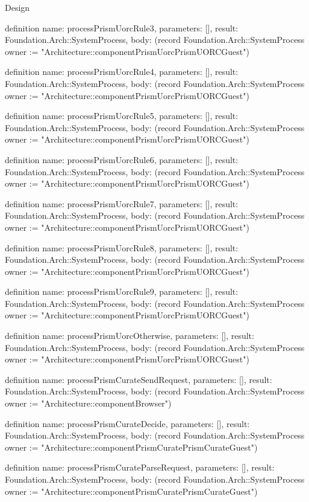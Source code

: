 \begin{lexlean}{Design}
\begin{semanticmodule}
definition{
  name: processPrismUorcRule3,
  parameters: [],
  result: Foundation.Arch::SystemProcess,
  body: (record Foundation.Arch::SystemProcess {owner := "Architecture::componentPrismUorcPrismUORCGuest"})
}

definition{
  name: processPrismUorcRule4,
  parameters: [],
  result: Foundation.Arch::SystemProcess,
  body: (record Foundation.Arch::SystemProcess {owner := "Architecture::componentPrismUorcPrismUORCGuest"})
}

definition{
  name: processPrismUorcRule5,
  parameters: [],
  result: Foundation.Arch::SystemProcess,
  body: (record Foundation.Arch::SystemProcess {owner := "Architecture::componentPrismUorcPrismUORCGuest"})
}

definition{
  name: processPrismUorcRule6,
  parameters: [],
  result: Foundation.Arch::SystemProcess,
  body: (record Foundation.Arch::SystemProcess {owner := "Architecture::componentPrismUorcPrismUORCGuest"})
}

definition{
  name: processPrismUorcRule7,
  parameters: [],
  result: Foundation.Arch::SystemProcess,
  body: (record Foundation.Arch::SystemProcess {owner := "Architecture::componentPrismUorcPrismUORCGuest"})
}

definition{
  name: processPrismUorcRule8,
  parameters: [],
  result: Foundation.Arch::SystemProcess,
  body: (record Foundation.Arch::SystemProcess {owner := "Architecture::componentPrismUorcPrismUORCGuest"})
}

definition{
  name: processPrismUorcRule9,
  parameters: [],
  result: Foundation.Arch::SystemProcess,
  body: (record Foundation.Arch::SystemProcess {owner := "Architecture::componentPrismUorcPrismUORCGuest"})
}

definition{
  name: processPrismUorcOtherwise,
  parameters: [],
  result: Foundation.Arch::SystemProcess,
  body: (record Foundation.Arch::SystemProcess {owner := "Architecture::componentPrismUorcPrismUORCGuest"})
}

definition{
  name: processPrismCurateSendRequest,
  parameters: [],
  result: Foundation.Arch::SystemProcess,
  body: (record Foundation.Arch::SystemProcess {owner := "Architecture::componentBrowser"})
}

definition{
  name: processPrismCurateDecide,
  parameters: [],
  result: Foundation.Arch::SystemProcess,
  body: (record Foundation.Arch::SystemProcess {owner := "Architecture::componentPrismCuratePrismCurateGuest"})
}

definition{
  name: processPrismCurateParseRequest,
  parameters: [],
  result: Foundation.Arch::SystemProcess,
  body: (record Foundation.Arch::SystemProcess {owner := "Architecture::componentPrismCuratePrismCurateGuest"})
}


\end{semanticmodule}
\end{lexlean}

